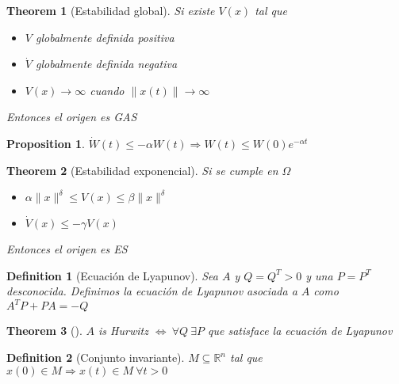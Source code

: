 \documentclass[leqno]{article}
\newtheorem*{theorem}{Theorem}
\newtheorem*{proposition}{Proposition}
\newtheorem*{definition}{Definition}
\begin{document}
\begin{theorem}[Estabilidad global] Si existe $V(x)$ tal que  
  \begin{itemize}[topsep=-6pt, itemsep=0pt]
    \item $V$ globalmente definida positiva
	\item  $\dot{V}$ globalmente definida negativa
	\item $V(x) \to \infty$ cuando $\|x(t)\|\to \infty$
  \end{itemize}
  Entonces el origen es GAS
\end{theorem}

\begin{proposition}
 $\dot{W}(t)\le -\alpha W(t) \Rightarrow W(t)\le W(0)e^{-\alpha t}$ 
\end{proposition}

\begin{theorem}[Estabilidad exponencial]Si se cumple en $\Omega $
  \begin{itemize}[topsep=-6pt, itemsep=0pt]
    \item $\alpha \|x\|^\delta\le V(x)\le \beta \|x\|^\delta$ 
	\item $\dot{V}(x)\le -\gamma V(x)$
  \end{itemize}
  Entonces el origen es ES
\end{theorem}

\begin{definition}[Ecuación de Lyapunov] Sea $A$ y  $Q = Q^T>0$ y una  $P=P^T$ desconocida. Definimos la ecuación de Lyapunov asociada a  $A$ como $A^TP+PA = -Q$
\end{definition}

\begin{theorem}[] $A$ is Hurwitz $\iff \ \forall Q \ \exists P$ que satisface la ecuación de Lyapunov
\end{theorem}

\begin{definition}[Conjunto invariante] $M\subseteq \mathbb{R}^n$ tal que $x(0)\in M \Rightarrow x(t)\in M \ \forall t>0$

\end{definition}
\end{document}
